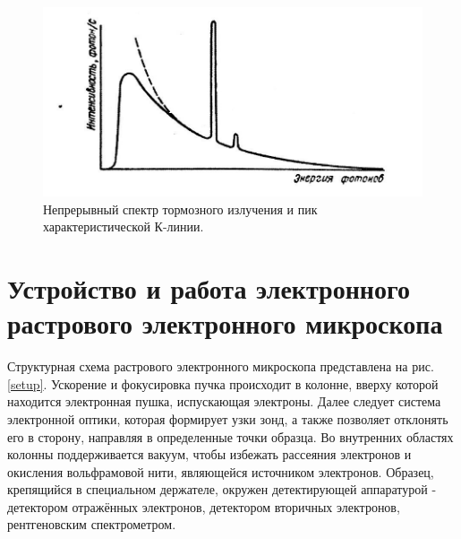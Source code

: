 \documentclass[a4paper]{article}
\begin{document}
\begin{itemize}
\begin{itemize}
        \begin{figure}[H]
            \centering
            \includegraphics[scale = 0.2]{klines_1.jpg}
            \caption{Непрерывный спектр тормозного излучения и пик характеристической К-линии.}
            \label{klines_1}
        \end{figure}

    \end{itemize}

\end{itemize}

\section{Устройство и работа электронного растрового электронного микроскопа}

Структурная схема растрового электронного микроскопа представлена на рис. \ref{setup}. Ускорение и фокусировка пучка происходит в колонне, вверху которой находится электронная пушка, 
испускающая электроны. Далее следует система электронной оптики, которая формирует узки зонд, а также позволяет отклонять его в сторону, направляя в определенные точки образца. 
Во внутренних областях колонны поддерживается вакуум, чтобы избежать рассеяния электронов и окисления вольфрамовой нити, являющейся источником электронов. Образец, крепящийся 
в специальном держателе, окружен детектирующей аппаратурой - детектором отражённых электронов, детектором вторичных электронов, рентгеновским спектрометром.
\end{document}
